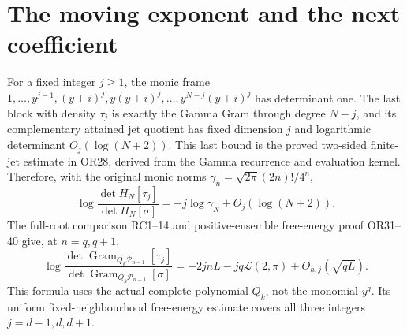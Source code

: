 \documentclass[11pt]{article}
\newcommand{\PP}{\mathcal P}\newcommand{\BB}{\mathcal B}
\newcommand{\Gram}{\operatorname{Gram}}\newcommand{\rank}{\operatorname{rank}}
\begin{document}
\section{The moving exponent and the next coefficient}
For a fixed integer $j\ge1$, the monic frame
$1,\ldots,y^{j-1},(y+i)^j,y(y+i)^j,\ldots,y^{N-j}(y+i)^j$
has determinant one. The last block with density $\tau_j$ is exactly the
Gamma Gram through degree $N-j$, and its complementary attained jet quotient
has fixed dimension $j$ and logarithmic determinant $O_j(\log(N+2))$.
This last bound is the proved two-sided finite-jet estimate in OR28, derived
from the Gamma recurrence and evaluation kernel. Therefore, with the original
monic norms $\gamma_n=\sqrt{2\pi}(2n)!/4^n$,
\begin{equation}\tag{SR24}
 \log\frac{\det H_N[\tau_j]}{\det H_N[\sigma]}
 =-j\log\gamma_N+O_j(\log(N+2)).
\end{equation}
The full-root comparison RC1--14 and positive-ensemble free-energy proof OR31--40
give, at $n=q,q+1$,
\begin{equation}\tag{SR25}
 \log\frac{\det\Gram_{Q_k\PP_{n-1}}[\tau_j]}
 {\det\Gram_{Q_k\PP_{n-1}}[\sigma]}
 =-2jnL-jq\mathcal L(2,\pi)+O_{h,j}(\sqrt{qL}).
\end{equation}
This formula uses the actual complete polynomial $Q_k$, not the monomial
$y^q$. Its uniform fixed-neighbourhood free-energy estimate covers all three
integers $j=d-1,d,d+1$.
\end{document}
